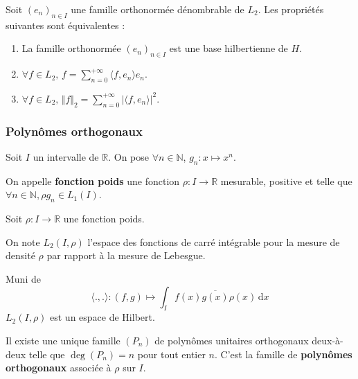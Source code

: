   \begin{theorem}
    Soit $(e_n)_{n \in I}$ une famille orthonormée dénombrable de $L_2$. Les propriétés suivantes sont équivalentes :
    \begin{enumerate}[label=(\roman*)]
      \item La famille orthonormée $(e_n)_{n \in I}$ est une base hilbertienne de $H$.
      \item $\forall f \in L_2, \, f = \sum_{n=0}^{+\infty} \langle f, e_n \rangle e_n$.
      \item $\forall f \in L_2, \, \Vert f \Vert_2 = \sum_{n=0}^{+\infty} \vert \langle f, e_n \rangle \vert^2$.
    \end{enumerate}
  \end{theorem}

  \subsubsection{Polynômes orthogonaux}


  Soit $I$ un intervalle de $\mathbb{R}$. On pose $\forall n \in \mathbb{N}$, $g_n : x \mapsto x^n$.

  \begin{definition}
    On appelle \textbf{fonction poids} une fonction $\rho : I \rightarrow \mathbb{R}$ mesurable, positive et telle que $\forall n \in \mathbb{N}, \rho g_n \in L_1(I)$.
  \end{definition}

  Soit $\rho : I \rightarrow \mathbb{R}$ une fonction poids.

  \begin{notation}
    On note $L_2(I, \rho)$ l'espace des fonctions de carré intégrable pour la mesure de densité $\rho$ par rapport à la mesure de Lebesgue.
  \end{notation}

  \begin{proposition}
    Muni de
    \[ \langle ., . \rangle : (f,g) \mapsto \int_I f(x) \overline{g(x)} \rho(x) \, \mathrm{d}x \]
    $L_2(I, \rho)$ est un espace de Hilbert.
  \end{proposition}

  \begin{theorem}
    Il existe une unique famille $(P_n)$ de polynômes unitaires orthogonaux deux-à-deux telle que $\deg(P_n) = n$ pour tout entier $n$. C'est la famille de \textbf{polynômes orthogonaux} associée à $\rho$ sur $I$.
  \end{theorem}

